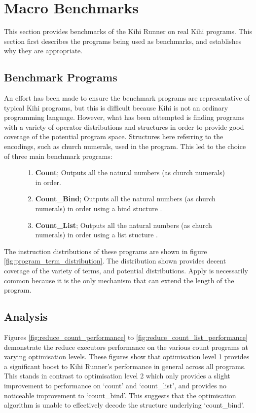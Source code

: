\section{Macro Benchmarks}
This section provides benchmarks of the Kihi Runner on real Kihi programs. This section first describes the programs being used as benchmarks, and establishes why they are appropriate. 

\subsection{Benchmark Programs}
An effort has been made to ensure the benchmark programs are representative of typical Kihi programs, but this is difficult because Kihi is not an ordinary programming language. However, what has been attempted is finding programs with a variety of operator distributions and structures in order to provide good coverage of the potential program space. Structures here referring to the encodings, such as church numerals, used in the program. This led to the choice of three main benchmark programs:

\begin{figure}[H]
\centering
\begin{enumerate}
    \item \textbf{Count}; Outputs all the natural numbers (as church numerals) in order.
    \item \textbf{Count\_Bind}; Outputs all the natural numbers (as church numerals) in order using a bind stucture \cite{jones2018practice}.
    \item \textbf{Count\_List}; Outputs all the natural numbers (as church numerals) in order using a list stucture \cite{jones2018practice}.
\end{enumerate}
\end{figure}

The instruction distributions of these programs are shown in figure \ref{fig:program_term_distribution}. The distribution shown provides decent coverage of the variety of terms, and potential distributions. Apply is necessarily common because it is the only mechanism that can extend the length of the program.



\subsection{Analysis}
Figures \ref{fig:reduce_count_performance} to \ref{fig:reduce_count_list_performance} demonstrate the reduce executors performance on the various count programs at varying optimisation levels. These figures show that optimisation level 1 provides a significant boost to Kihi Runner's performance in general across all programs. This stands in contrast to optimisation level 2 which only provides a slight improvement to performance on `count' and `count\_list', and provides no noticeable improvement to `count\_bind'. This suggests that the optimisation algorithm is unable to effectively decode the structure underlying `count\_bind'.

